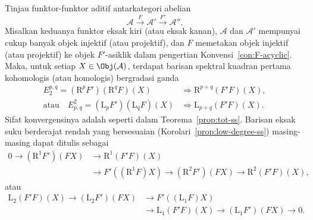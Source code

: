 \begin{theorem}
\label{prop:Grothendieck-ss}
	Tinjau funktor-funktor aditif antarkategori abelian
	\[ \mathcal{A} \xrightarrow{F} \mathcal{A}' \xrightarrow{F'} \mathcal{A}''. \]
	Misalkan keduanya funktor eksak kiri (atau eksak kanan), $\mathcal{A}$ dan
	$\mathcal{A}'$ mempunyai cukup banyak objek injektif (atau projektif), dan
	$F$ memetakan objek injektif (atau projektif) ke objek $F'$-asiklik dalam
	pengertian Konvensi~\ref{con:F-acyclic}. Maka, untuk setiap
	$X\in\Obj(\mathcal{A})$, terdapat barisan spektral kuadran pertama
	kohomologis (atau homologis) bergradasi ganda
	\begin{align*}
		E_2^{p,q} = (\mathrm{R}^p F') (\mathrm{R}^q F)(X) & \Rightarrow \mathrm{R}^{p+q} (F'F)(X), \\
		\text{atau} \quad E^2_{p,q} = (\mathrm{L}_p F') (\mathrm{L}_q F)(X) & \Rightarrow \mathrm{L}_{p+q}(F'F)(X).
	\end{align*}
	Sifat konvergensinya adalah seperti dalam Teorema~\ref{prop:tot-ss}.
	Barisan eksak suku berderajat rendah yang bersesuaian
	(Korolari~\ref{prop:low-degree-ss}) masing-masing dapat ditulis sebagai
	\begin{equation*}\begin{split}
		0 \to (\mathrm{R}^1 F')(FX) & \to \mathrm{R}^1(F'F)(X) \\
		& \to F'\left( (\mathrm{R}^1 F)X \right) \to (\mathrm{R}^2 F')(FX) \to \mathrm{R}^2(F'F)(X),
	\end{split}\end{equation*}
	atau
	\begin{equation*}\begin{split}
		\mathrm{L}_2(F'F)(X) \to (\mathrm{L}_2 F')(FX) & \to F'\left( (\mathrm{L}_1 F)X \right) \\
		& \to \mathrm{L}_1(F'F)(X) \to (\mathrm{L}_1 F')(FX) \to 0.
	\end{split}\end{equation*}
\end{theorem}
